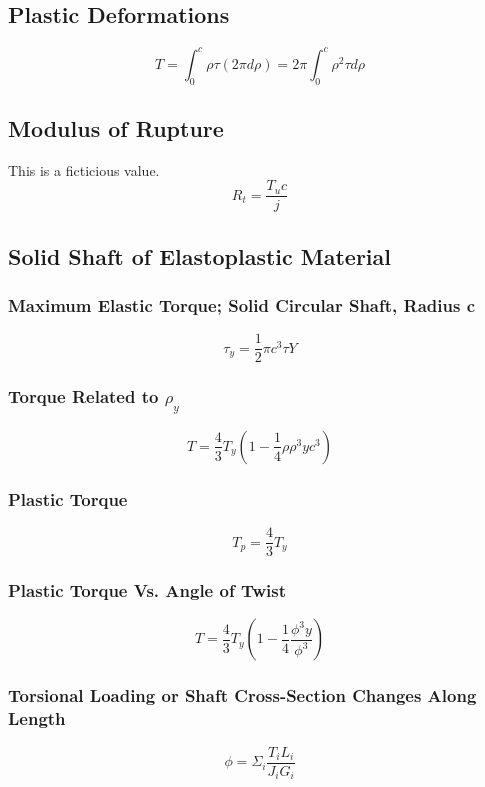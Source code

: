 \documentclass[10pt,landscape]{article}
\begin{document}
\begin{multicols}{3}
\subsection{Plastic Deformations}
\begin{equation}
    T=\int^c_0\rho\tau(2\pi d\rho)=2\pi\int^c_0\rho^2\tau d\rho
\end{equation}
\subsection{Modulus of Rupture}
This is a ficticious value.
\begin{equation}
    R_t=\frac{T_uc}{j}
\end{equation}
\subsection{Solid Shaft of Elastoplastic Material}
\subsubsection{Maximum Elastic Torque; Solid Circular Shaft, Radius c}
\begin{equation}
    \tau_y=\frac{1}{2}\pi c^3\tau Y
\end{equation}
\subsubsection{Torque Related to $\rho_y$}
\begin{equation}
    T=\frac{4}{3}T_y(1-\frac{1}{4}\rho{\rho^3y}{c^3})
\end{equation}
\subsubsection{Plastic Torque}
\begin{equation}
    T_p=\frac{4}{3}T_y
\end{equation}
\subsubsection{Plastic Torque Vs. Angle of Twist}
\begin{equation}
    T=\frac{4}{3}T_y(1-\frac{1}{4}\frac{\phi^3y}{\phi^3})
\end{equation}
\subsubsection{Torsional Loading or Shaft Cross-Section Changes Along Length}
\begin{equation}
    \phi=\Sigma_i\frac{T_iL_i}{J_iG_i}
\end{equation}

\end{multicols}
\end{document}
